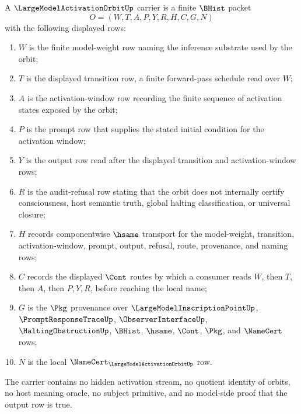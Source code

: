 \begin{definition}
\label{def:largemodel-activation-orbit-carrier}
A $\LargeModelActivationOrbitUp$ carrier is a finite $\BHist$ packet
$$
O=(W,T,A,P,Y,R,H,C,G,N)
$$
with the following displayed rows:
\begin{enumerate}
\item $W$ is the finite model-weight row naming the inference substrate used by the orbit;
\item $T$ is the displayed transition row, a finite forward-pass schedule read over $W$;
\item $A$ is the activation-window row recording the finite sequence of activation states exposed by the orbit;
\item $P$ is the prompt row that supplies the stated initial condition for the activation window;
\item $Y$ is the output row read after the displayed transition and activation-window rows;
\item $R$ is the audit-refusal row stating that the orbit does not internally certify consciousness, host semantic truth, global halting classification, or universal closure;
\item $H$ records componentwise $\hsame$ transport for the model-weight, transition, activation-window, prompt, output, refusal, route, provenance, and naming rows;
\item $C$ records the displayed $\Cont$ routes by which a consumer reads $W$, then $T$, then $A$, then $P,Y,R$, before reaching the local name;
\item $G$ is the $\Pkg$ provenance over $\LargeModelInscriptionPointUp$, $\PromptResponseTraceUp$, $\ObserverInterfaceUp$, $\HaltingObstructionUp$, $\BHist$, $\hsame$, $\Cont$, $\Pkg$, and $\NameCert$ rows;
\item $N$ is the local $\NameCert_{\LargeModelActivationOrbitUp}$ row.
\end{enumerate}
The carrier contains no hidden activation stream, no quotient identity of orbits, no host meaning oracle, no subject primitive, and no model-side proof that the output row is true.
\end{definition}

